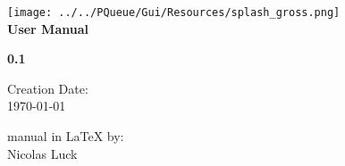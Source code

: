 
\usepackage{tikz}
\usetikzlibrary{snakes}
\usepackage{../PScript}
\usepackage{../PQueueScript}

\newcommand{\photoss}{\PHO{}}
\newcommand{\pjob}{\PJOB{}}
\newcommand{\matlab}{\Matt{}}
\newcommand{\pho}{.pho}
\newcommand{\pscript}{.pscript}
\newcommand{\pjobeditor}{\mbox{PJobEditor}}
\newcommand{\mac}{\mbox{MacOSX\textsuperscript{\textregistered}}}

\makeindex



	\begin{titlepage}

	\vspace*{2cm}

	\begin{center}
		\texttt{[image: ../../PQueue/Gui/Resources/splash\_gross.png]}\\
		\vspace*{3cm}
	 \Huge{  \textcolor{phocolor}{\textbf{User Manual}}}\\
	\end{center}

	\vspace{1cm} 
	\begin{center}
	\textcolor{phocolor}{\textbf{\Huge \PQUEUE{} 0.1}}
	\end{center}

	\end{titlepage}

\newpage 
\pagestyle{empty}

\vspace*{16.0 cm}
\noindent \Large{Creation Date:}\\
\noindent \Large{\today}\bb

\noindent \Large{\PQUEUE{} manual in \LaTeX{} by: }\\
\noindent \Large{Nicolas Luck}\\
\normalsize


